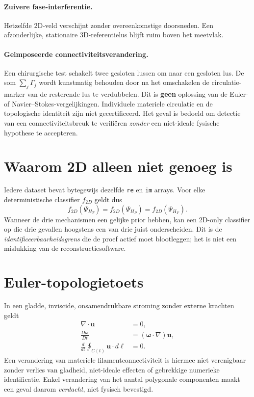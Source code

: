 \documentclass[11pt,a4paper]{article}
\begin{document}
\paragraph{Zuivere fase-interferentie.}
Hetzelfde 2D-veld verschijnt zonder overeenkomstige doorsneden.
Een afzonderlijke, stationaire 3D-referentielus blijft ruim boven het meetvlak.

\paragraph{Geimposeerde connectiviteitsverandering.}
Een chirurgische test schakelt twee gesloten lussen om naar een gesloten lus.
De som $\sum_j\Gamma_j$ wordt kunstmatig behouden door na het omschakelen de
circulatie-marker van de resterende lus te verdubbelen. Dit is \textbf{geen}
oplossing van de Euler- of Navier--Stokes-vergelijkingen.
Individuele materiele circulatie en de topologische identiteit zijn niet
gecertificeerd. Het geval is bedoeld om detectie van een connectiviteitsbreuk
te verifi\"eren \emph{zonder} een niet-ideale fysische hypothese te accepteren.

\section{Waarom 2D alleen niet genoeg is}
Iedere dataset bevat bytegewijs dezelfde \texttt{re} en \texttt{im} arrays.
Voor elke deterministische classifier $f_{2D}$ geldt dus
\begin{equation}
 f_{2D}(\Psi_{H_T})=f_{2D}(\Psi_{H_P})=f_{2D}(\Psi_{H_F}).
\end{equation}
Wanneer de drie mechanismen een gelijke prior hebben, kan een 2D-only classifier
op die drie gevallen hoogstens een van drie juist onderscheiden.
Dit is de \emph{identificeerbaarheidsgrens} die de proef actief moet blootleggen;
het is niet een mislukking van de reconstructiesoftware.

\section{Euler-topologietoets}
In een gladde, inviscide, onsamendrukbare stroming zonder externe krachten geldt
\begin{align}
\nabla\cdot\mathbf u&=0,\\
\frac{D\boldsymbol\omega}{Dt}&=(\boldsymbol\omega\cdot\nabla)\mathbf u,\\
\frac{d}{dt}\oint_{C(t)}\mathbf u\cdot d\boldsymbol\ell&=0.
\end{align}
Een verandering van materiele filamentconnectiviteit is hiermee niet
verenigbaar zonder verlies van gladheid, niet-ideale effecten of gebrekkige
numerieke identificatie. Enkel verandering van het aantal polygonale
componenten maakt een geval daarom \emph{verdacht}, niet fysisch bevestigd.
\end{document}
